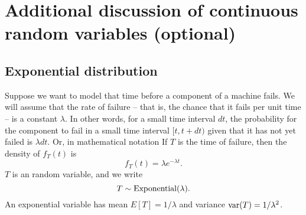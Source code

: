  \section{Additional discussion of continuous random variables (optional)}


\subsection{Exponential distribution}
 Suppose we want to model that time before a component of a machine fails. We will assume that the rate of failure -- that is, the chance that it fails per unit time -- is a constant $\lambda$. In other words, for a small time interval $dt$, the probability for the component to fail in a small time interval $[t,t+dt)$ given that it has not yet failed is $\lambda dt$. Or, in mathematical notation 
 If $T$ is the time of failure, then the density of $f_T(t)$ is 
\begin{equation*}
f_T(t) = \lambda e^{-\lambda t}.
\end{equation*}
$T$ is an  random variable, and we write
\begin{equation*}
T \sim {\rm Exponential}(\lambda).
\end{equation*}
An exponential variable has mean $E[T] = 1/\lambda$ and variance ${\rm var}(T) = 1/\lambda^2$. 



